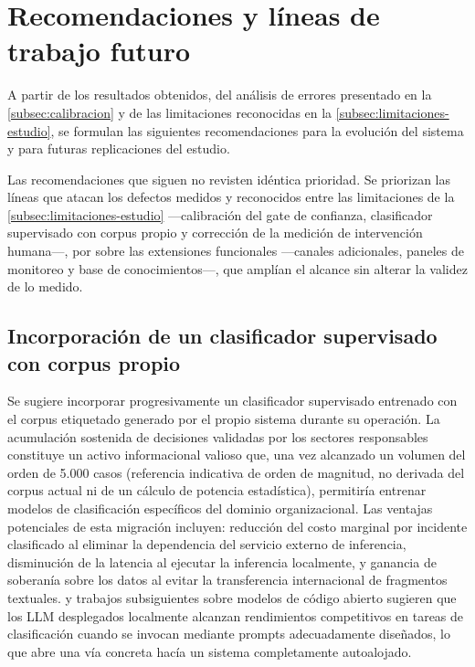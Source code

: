 \section{Recomendaciones y líneas de trabajo futuro}\label{sec:recomendaciones}

A partir de los resultados obtenidos, del análisis de errores presentado en la \autoref{subsec:calibracion} y de las limitaciones reconocidas en la \autoref{subsec:limitaciones-estudio}, se formulan las siguientes recomendaciones para la evolución del sistema y para futuras replicaciones del estudio.

Las recomendaciones que siguen no revisten idéntica prioridad. Se priorizan las líneas que atacan los defectos medidos y reconocidos entre las limitaciones de la \autoref{subsec:limitaciones-estudio} ---calibración del gate de confianza, clasificador supervisado con corpus propio y corrección de la medición de intervención humana---, por sobre las extensiones funcionales ---canales adicionales, paneles de monitoreo y base de conocimientos---, que amplían el alcance sin alterar la validez de lo medido.

\subsection{Incorporación de un clasificador supervisado con corpus propio}\label{subsec:clasificador-supervisado}

Se sugiere incorporar progresivamente un clasificador supervisado entrenado con el corpus etiquetado generado por el propio sistema durante su operación. La acumulación sostenida de decisiones validadas por los sectores responsables constituye un activo informacional valioso que, una vez alcanzado un volumen del orden de 5.000 casos (referencia indicativa de orden de magnitud, no derivada del corpus actual ni de un cálculo de potencia estadística), permitiría entrenar modelos de clasificación específicos del dominio organizacional. Las ventajas potenciales de esta migración incluyen: reducción del costo marginal por incidente clasificado al eliminar la dependencia del servicio externo de inferencia, disminución de la latencia al ejecutar la inferencia localmente, y ganancia de soberanía sobre los datos al evitar la transferencia internacional de fragmentos textuales. \textcite{Touvron2023_llama2} y trabajos subsiguientes sobre modelos de código abierto sugieren que los LLM desplegados localmente alcanzan rendimientos competitivos en tareas de clasificación cuando se invocan mediante prompts adecuadamente diseñados, lo que abre una vía concreta hacía un sistema completamente autoalojado.

